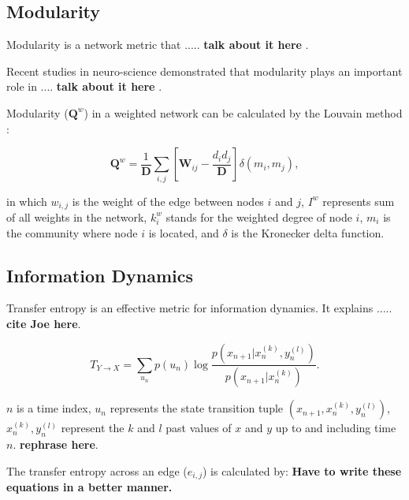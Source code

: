 \documentclass[%
 reprint,
 amsmath,amssymb,
 aps,
floatfix,
]{revtex4-2}
\begin{document}
\subsection{\label{sec:level2} Modularity}
Modularity is a network metric that ..... \textbf{talk about it here} \cite{Rubinov2009}.

Recent studies in neuro-science demonstrated that modularity plays an important role in .... \textbf{talk about it here} \cite{Godwin2015}. 
 
Modularity ($\mathbf Q^w$) in a weighted network can be calculated by the Louvain method \cite{Blondel2008}:
 
\begin{equation}
\mathbf Q^w = \frac{1}{\mathbf D} \sum \limits_{i,j} \left[\mathbf W_{ij} - \frac{d_i d_j}{\mathbf D} \right] \delta(m_i, m_j),
\label{eq:mod}
\end{equation}

in which $w_{i,j}$ is the weight of the edge between nodes $i$ and $j$, $I^w$ represents sum of all weights in the network, $k_i^w$ stands for the weighted degree of node $i$, $m_i$ is the community where node $i$ is located, and $\delta$ is the Kronecker delta function.

\subsection{\label{sec:level2} Information Dynamics}

Transfer entropy is an effective metric for information dynamics. It explains ..... \textbf{cite Joe here}.

\begin{equation}
T_{Y \rightarrow X} = \sum \limits_{u_n} p(u_n) \log \frac{p(x_{n+1}| x_n^{(k)}, y_n^{(l)})}{p(x_{n+1}|x_n^{(k)})}.
\end{equation}

$n$ is a time index, $u_n$ represents the state transition tuple $(x_{n+1}, x_n^{(k)}, y_n^{(l)})$, $x_n^{(k)}, y_n^{(l)}$ represent the $k$ and $l$ past values of $x$ and $y$ up to and including time $n$. \textbf{rephrase here}.


The transfer entropy across an edge ($e_{i,j}$) is calculated by:
\textbf{Have to write these equations in a better manner.}
\end{document}
